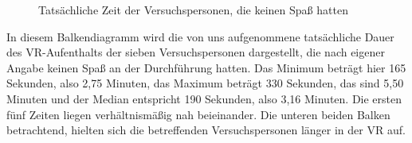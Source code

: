 \documentclass{Paper}
\begin{document}
        \begin{figure}[H]
  \caption{Tatsächliche Zeit der Versuchspersonen, die keinen Spaß hatten}
  \label{ZeitKeinSpass}
        \end{figure}
In diesem Balkendiagramm wird die von uns aufgenommene tatsächliche Dauer des VR-Aufenthalts der sieben Versuchspersonen dargestellt, die nach eigener Angabe keinen Spaß an der Durchführung hatten. Das Minimum beträgt hier 165 Sekunden, also 2,75 Minuten, das Maximum beträgt 330 Sekunden, das sind 5,50 Minuten und der Median entspricht 190 Sekunden, also 3,16 Minuten. Die ersten fünf Zeiten liegen verhältnismäßig nah beieinander. Die unteren beiden Balken betrachtend, hielten sich die betreffenden Versuchspersonen länger in der VR auf.
\end{document}
